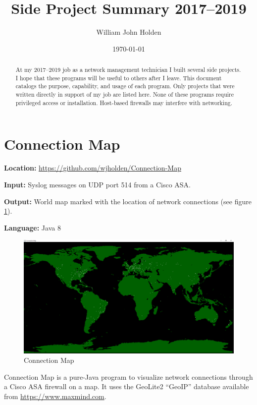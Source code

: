 \documentclass[12pt]{article}
\title{Side Project Summary 2017--2019}
\author{William John Holden}
\date{\today}
\begin{document}
\maketitle

\begin{abstract}
At my 2017--2019 job as a network management technician I built several side projects.
I hope that these programs will be useful to others after I leave.
This document catalogs the purpose, capability, and usage of each program.
Only projects that were written directly in support of my job are listed here.
None of these programs require privileged access or installation.
Host-based firewalls may interfere with networking.
\end{abstract}


\section{Connection Map} \label{sec:ConnectionMap}

\noindent \textbf{Location:} \url{https://github.com/wjholden/Connection-Map}

\noindent \textbf{Input:} Syslog messages on UDP port 514 from a Cisco ASA.

\noindent \textbf{Output:} World map marked with the location of network connections (see figure \ref{fig:connection-map}).

\noindent \textbf{Language:} Java 8

\begin{figure}[h]
\centering
\includegraphics[width=.80\textwidth]{Connection-Map}
\caption{Connection Map}
\label{fig:connection-map}
\end{figure}

Connection Map is a pure-Java program to visualize network connections through a Cisco ASA firewall on a map. It uses the GeoLite2 ``GeoIP'' database available from \url{https://www.maxmind.com}.
\end{document}
